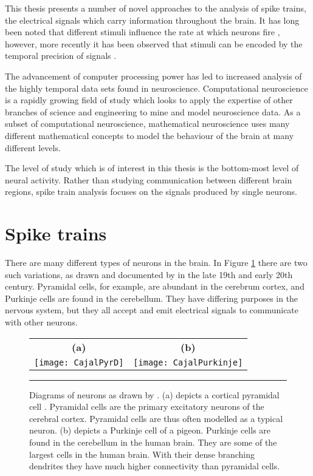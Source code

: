 This thesis presents a number of novel approaches to the analysis of spike trains, the electrical signals which carry information throughout the brain. It has long been noted that different stimuli influence the rate at which neurons fire \citep{Knight1972a}, however, more recently it has been observed that stimuli can be encoded by the temporal precision of signals \citep{HopkinsBass1981a,EngelEtAl1992a}.
 
The advancement of computer processing power has led to increased analysis of the highly temporal data sets found in neuroscience. Computational neuroscience is a rapidly growing field of study which looks to apply the expertise of other branches of science and engineering to mine and model neuroscience data.  As a subset of computational neuroscience, mathematical neuroscience uses many different mathematical concepts to model the behaviour of the brain at many different levels.
 
The level of study which is of interest in this thesis is the bottom-most level of neural activity.  Rather than studying communication between different brain regions, spike train analysis focuses on the signals produced by single neurons.


\section{Spike trains}

There are many different types of neurons in the brain. In Figure \ref{Cajal} there are two such variations, as drawn and documented by \citet{Cajal1904a} in the late 19th and early 20th century. Pyramidal cells, for example, are abundant in the cerebrum cortex, and Purkinje cells are found in the cerebellum.  They have differing purposes in the nervous system, but they all accept and emit electrical signals to communicate with other neurons.

\begin{figure}
\begin{center}
\begin{tabular}{cc}
{\bf (a)} & {\bf (b)} \\
\texttt{[image: CajalPyrD]} & \texttt{[image: CajalPurkinje]}
\end{tabular}
\bigskip
\rule{33em}{0.5pt}
\caption{\label{Cajal} Diagrams of neurons as drawn by \citet{Cajal1904a}.  (a) depicts a cortical pyramidal cell .  Pyramidal cells are the primary excitatory neurons of the cerebral cortex.  Pyramidal cells are thus often modelled as a typical neuron.  (b) depicts a Purkinje cell of a pigeon.  Purkinje cells are found in the cerebellum in the human brain. They are some of the largest cells in the human brain. With their dense branching dendrites they have much higher connectivity than pyramidal cells.}
\end{center}
\end{figure} 

